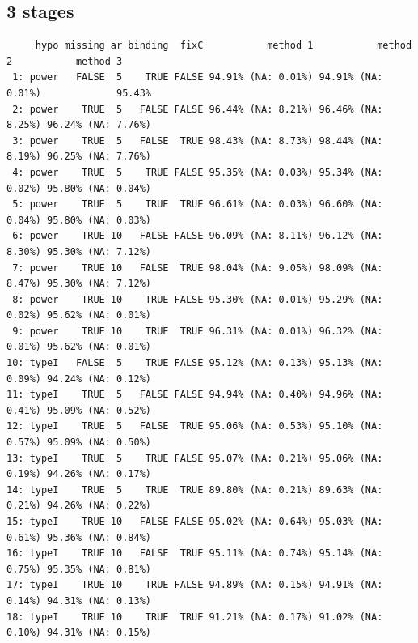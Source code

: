 \documentclass[12pt]{article}
\begin{document}
\clearpage

\subsection{3 stages}
\label{sec:org85d6cea}

\begin{verbatim}
     hypo missing ar binding  fixC           method 1           method 2           method 3
 1: power   FALSE  5    TRUE FALSE 94.91% (NA: 0.01%) 94.91% (NA: 0.01%)             95.43%
 2: power    TRUE  5   FALSE FALSE 96.44% (NA: 8.21%) 96.46% (NA: 8.25%) 96.24% (NA: 7.76%)
 3: power    TRUE  5   FALSE  TRUE 98.43% (NA: 8.73%) 98.44% (NA: 8.19%) 96.25% (NA: 7.76%)
 4: power    TRUE  5    TRUE FALSE 95.35% (NA: 0.03%) 95.34% (NA: 0.02%) 95.80% (NA: 0.04%)
 5: power    TRUE  5    TRUE  TRUE 96.61% (NA: 0.03%) 96.60% (NA: 0.04%) 95.80% (NA: 0.03%)
 6: power    TRUE 10   FALSE FALSE 96.09% (NA: 8.11%) 96.12% (NA: 8.30%) 95.30% (NA: 7.12%)
 7: power    TRUE 10   FALSE  TRUE 98.04% (NA: 9.05%) 98.09% (NA: 8.47%) 95.30% (NA: 7.12%)
 8: power    TRUE 10    TRUE FALSE 95.30% (NA: 0.01%) 95.29% (NA: 0.02%) 95.62% (NA: 0.01%)
 9: power    TRUE 10    TRUE  TRUE 96.31% (NA: 0.01%) 96.32% (NA: 0.01%) 95.62% (NA: 0.01%)
10: typeI   FALSE  5    TRUE FALSE 95.12% (NA: 0.13%) 95.13% (NA: 0.09%) 94.24% (NA: 0.12%)
11: typeI    TRUE  5   FALSE FALSE 94.94% (NA: 0.40%) 94.96% (NA: 0.41%) 95.09% (NA: 0.52%)
12: typeI    TRUE  5   FALSE  TRUE 95.06% (NA: 0.53%) 95.10% (NA: 0.57%) 95.09% (NA: 0.50%)
13: typeI    TRUE  5    TRUE FALSE 95.07% (NA: 0.21%) 95.06% (NA: 0.19%) 94.26% (NA: 0.17%)
14: typeI    TRUE  5    TRUE  TRUE 89.80% (NA: 0.21%) 89.63% (NA: 0.21%) 94.26% (NA: 0.22%)
15: typeI    TRUE 10   FALSE FALSE 95.02% (NA: 0.64%) 95.03% (NA: 0.61%) 95.36% (NA: 0.84%)
16: typeI    TRUE 10   FALSE  TRUE 95.11% (NA: 0.74%) 95.14% (NA: 0.75%) 95.35% (NA: 0.81%)
17: typeI    TRUE 10    TRUE FALSE 94.89% (NA: 0.15%) 94.91% (NA: 0.14%) 94.31% (NA: 0.13%)
18: typeI    TRUE 10    TRUE  TRUE 91.21% (NA: 0.17%) 91.02% (NA: 0.10%) 94.31% (NA: 0.15%)
\end{verbatim}
\end{document}
